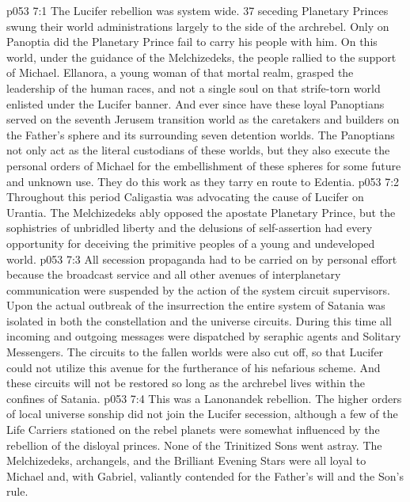 \vs p053 7:1 The Lucifer rebellion was system wide. 37 seceding Planetary Princes swung their world administrations largely to the side of the archrebel. Only on Panoptia did the Planetary Prince fail to carry his people with him. On this world, under the guidance of the Melchizedeks, the people rallied to the support of Michael. Ellanora, a young woman of that mortal realm, grasped the leadership of the human races, and not a single soul on that strife\hyp{}torn world enlisted under the Lucifer banner. And ever since have these loyal Panoptians served on the seventh Jerusem transition world as the caretakers and builders on the Father’s sphere and its surrounding seven detention worlds. The Panoptians not only act as the literal custodians of these worlds, but they also execute the personal orders of Michael for the embellishment of these spheres for some future and unknown use. They do this work as they tarry en route to Edentia.
\vs p053 7:2 Throughout this period Caligastia was advocating the cause of Lucifer on Urantia. The Melchizedeks ably opposed the apostate Planetary Prince, but the sophistries of unbridled liberty and the delusions of self\hyp{}assertion had every opportunity for deceiving the primitive peoples of a young and undeveloped world.
\vs p053 7:3 All secession propaganda had to be carried on by personal effort because the broadcast service and all other avenues of interplanetary communication were suspended by the action of the system circuit supervisors. Upon the actual outbreak of the insurrection the entire system of Satania was isolated in both the constellation and the universe circuits. During this time all incoming and outgoing messages were dispatched by seraphic agents and Solitary Messengers. The circuits to the fallen worlds were also cut off, so that Lucifer could not utilize this avenue for the furtherance of his nefarious scheme. And these circuits will not be restored so long as the archrebel lives within the confines of Satania.
\vs p053 7:4 This was a Lanonandek rebellion. The higher orders of local universe sonship did not join the Lucifer secession, although a few of the Life Carriers stationed on the rebel planets were somewhat influenced by the rebellion of the disloyal princes. None of the Trinitized Sons went astray. The Melchizedeks, archangels, and the Brilliant Evening Stars were all loyal to Michael and, with Gabriel, valiantly contended for the Father’s will and the Son’s rule.
